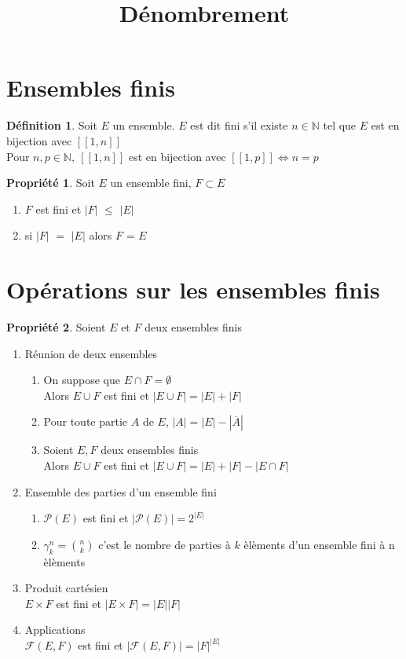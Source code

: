 \documentclass[fleqn]{article}
\title{D\'enombrement}
\date{}
\theoremstyle{definition} \newtheorem*{defi}{D\'efinition}
\theoremstyle{definition} \newtheorem*{theo}{Th\'eor\`eme}
\theoremstyle{definition} \newtheorem*{coro}{Corollaire}
\theoremstyle{remark} \newtheorem*{rqs}{Remarques}
\theoremstyle{definition} \newtheorem*{prop}{Propri\'et\'e}
\begin{document}
\maketitle

\section{Ensembles finis}
\begin{defi}
	Soit $E$ un ensemble. $E$ est dit fini s'il existe $n \in \mathbb{N}$ tel que $E$ est en bijection avec $[\![1,n]\!]$ \\
	Pour $n, p \in \mathbb{N},\ [\![1,n]\!]$ est en bijection avec $[\![1,p]\!] \Leftrightarrow n = p$
\end{defi}

\begin{prop} Soit $E$ un ensemble fini, $F \subset E$
	\begin{enumerate}
		\item $F$ est fini et $|F|$ $\leq$ $|E|$
		\item si $|F|$ $=$ $|E|$ alors $F$ = $E$
	\end{enumerate}
\end{prop}

\section{Op\'erations sur les ensembles finis}
\begin{prop} Soient $E$ et $F$ deux ensembles finis
	\begin{enumerate}
		\item R\'eunion de deux ensembles
			\begin{enumerate}
				\item On suppose que $E \cap F = \emptyset$ \\
					Alors $E \cup F$ est fini et $|E \cup F| = |E| + |F|$
				\item Pour toute partie $A$ de $E$, $|A| = |E| - |\overline{A}|$
				\item Soient $E, F$ deux ensembles finis \\
					Alors $E\cup F$ est fini et $|E \cup F| = |E| + |F| - |E \cap F|$
			\end{enumerate}
		\item Ensemble des parties d'un ensemble fini
			\begin{enumerate}
			\item $\mathcal{P}(E)$ est fini et $|\mathcal{P}(E)| = 2^{|E|}$
			\item $\gamma_k^n = \binom{n}{k}$ c'est le nombre de parties \`a $k$ \`el\`ements d'un ensemble fini \`a n \`el\`ements
			\end{enumerate}
		\item Produit cart\'esien \\
			$E\times F$ est fini et $|E\times F| = |E||F|$
		\item Applications \\
			$\mathcal{F}(E,F)$ est fini et $|\mathcal{F}(E,F)| = |F|^{|E|}$
	\end{enumerate}
\end{prop}
\end{document}
